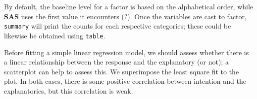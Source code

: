 \documentclass[
]{book}
\newenvironment{Shaded}{\begin{snugshade}}{\end{snugshade}}
\newcommand{\CommentTok}[1]{\textcolor[rgb]{0.56,0.35,0.01}{\textit{#1}}}
\newcommand{\DataTypeTok}[1]{\textcolor[rgb]{0.13,0.29,0.53}{#1}}
\newcommand{\KeywordTok}[1]{\textcolor[rgb]{0.13,0.29,0.53}{\textbf{#1}}}
\newcommand{\NormalTok}[1]{#1}
\newcommand{\OperatorTok}[1]{\textcolor[rgb]{0.81,0.36,0.00}{\textbf{#1}}}
\newcommand{\OtherTok}[1]{\textcolor[rgb]{0.56,0.35,0.01}{#1}}
\newcommand{\StringTok}[1]{\textcolor[rgb]{0.31,0.60,0.02}{#1}}
\begin{document}
\begin{Shaded}
\end{Shaded}

By default, the baseline level for a factor is based on the alphabetical order, while \textbf{SAS} uses the first value it encounters (?). Once the variables are cast to factor, \texttt{summary} will print the counts for each respective categories; these could be likewise be obtained using \texttt{table}.

Before fitting a simple linear regression model, we should assess whether there is a linear relationship between the response and the explanatory (or not); a scatterplot can help to assess this. We superimpose the least square fit to the plot. In both cases, there is some positive correlation between intention and the explanatories, but this correlation is weak.
\end{document}
